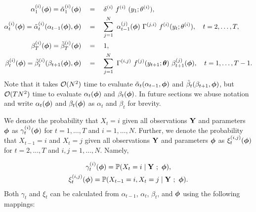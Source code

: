 \begin{align}
    \alpha_1^{(i)}(\boldsymbol{\phi}) = \tilde \alpha_1^{(i)}(\boldsymbol{\phi}) \quad &= \quad  \delta^{(i)} ~ f^{(i)} ~ (y_1;\theta^{(i)}), \label{eqn:alpha_1} \\
    \alpha_t^{(i)}(\boldsymbol{\phi}) = \tilde \alpha_t^{(i)}(\alpha_{t-1}(\boldsymbol{\phi}),\boldsymbol{\phi}) \quad &= \quad \sum_{j=1}^N ~ \alpha_{t-1}^{(j)}(\boldsymbol{\phi}) ~ \Gamma^{(j,i)} ~ f^{(i)}(y_t;\theta^{(i)}), \quad t = 2,\ldots,T, \label{eqn:alpha} \\
    \beta_T^{(i)}(\boldsymbol{\phi}) = \tilde \beta_T^{(i)}(\boldsymbol{\phi}) \quad &= \quad  1, \label{eqn:beta_T} \\
    \beta_t^{(i)}(\boldsymbol{\phi}) = \tilde \beta_t^{(i)}(\beta_{t+1}(\boldsymbol{\phi}), \boldsymbol{\phi}) \quad &= \quad \sum_{j=1}^N ~ \Gamma^{(i,j)} ~ f^{(j)}(y_{t+1};\boldsymbol{\theta}) ~ \beta^{(j)}_{t+1}(\boldsymbol{\phi}), \quad t = 1,\ldots,T-1. \label{eqn:beta}
\end{align}
%
%
Note that it takes $\mathcal{O}(N^2)$ time to evaluate $\tilde \alpha_t (\alpha_{t-1},\boldsymbol{\phi})$ and $\tilde \beta_t(\beta_{t+1},\boldsymbol{\phi})$, but $\mathcal{O}(TN^2)$ time to evaluate $\alpha_t(\boldsymbol{\phi})$ and $\beta_t(\boldsymbol{\phi})$. In future sections we abuse notation and write $\alpha_t(\boldsymbol{\phi})$ and $\beta_t(\boldsymbol{\phi})$ as $\alpha_t$ and $\beta_t$ for brevity. 

We denote the probability that $X_t = i$ given all observations $\mathbf{Y}$ and parameters $\boldsymbol{\phi}$ as $\gamma_t^{(i)}(\boldsymbol{\phi})$ for $t = 1,\ldots,T$ and $i = 1,\ldots,N$. Further, we denote the probability that $X_{t-1} = i$ and $X_t = j$ given all observations $\mathbf{Y}$ and parameters $\boldsymbol{\phi}$ as $\xi_t^{(i,j)}(\boldsymbol{\phi})$ for $t = 2,\ldots,T$ and $i,j = 1,\ldots,N$. Namely,

\begin{gather}
    \gamma_t^{(i)}(\boldsymbol{\phi}) = \mathbb{P}(X_t = i \mid \mathbf{Y} ~;~ \boldsymbol{\phi}), \\ \xi_t^{(i,j)}(\boldsymbol{\phi}) = \mathbb{P}(X_{t-1} = i, X_t = j \mid \mathbf{Y} ~;~ \boldsymbol{\phi}).
\end{gather}
%
Both $\gamma_t$ and $\xi_t$ can be calculated from $\alpha_{t-1}$, $\alpha_t$, $\beta_t$, and $\boldsymbol{\phi}$ using the following mappings:

